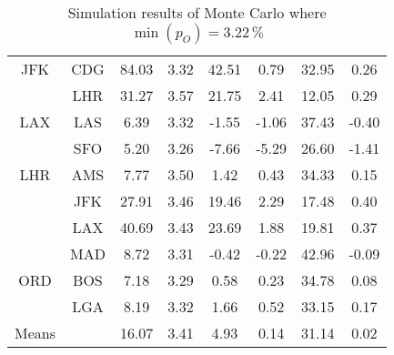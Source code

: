 \begin{table}
\begin{center}
\begin{tabular}{c c | c c | c c | c | c }
JFK  &  CDG  &   84.03  &  3.32  &   42.51  &  0.79  &  32.95  &  0.26 \\
~    &  LHR  &   31.27  &  3.57  &   21.75  &  2.41  &  12.05  &  0.29 \\[.5ex]
LAX  &  LAS  &    6.39  &  3.32  &   -1.55  &  -1.06  &  37.43  &  -0.40 \\
~    &  SFO  &    5.20  &  3.26  &   -7.66  &  -5.29  &  26.60  &  -1.41 \\[.5ex]
LHR  &  AMS  &    7.77  &  3.50  &    1.42  &  0.43  &  34.33  &  0.15 \\
~    &  JFK  &   27.91  &  3.46  &   19.46  &  2.29  &  17.48  &  0.40 \\
~    &  LAX  &   40.69  &  3.43  &   23.69  &  1.88  &  19.81  &  0.37 \\
~    &  MAD  &    8.72  &  3.31  &   -0.42  &  -0.22  &  42.96  &  -0.09 \\[.5ex]
ORD  &  BOS  &    7.18  &  3.29  &    0.58  &  0.23  &  34.78  &  0.08 \\
~    &  LGA  &    8.19  &  3.32  &    1.66  &  0.52  &  33.15  &  0.17 \\
\midrule
Means &  ~   &   16.07  &  3.41  &    4.93  &  0.14  &  31.14  &  0.02 \\
    \bottomrule
\end{tabular}
\caption{Simulation results of Monte Carlo where $\min(p_O) = 3.22\,\%$}
\label{tbl:resultsSecond}
\end{center}
\end{table}


